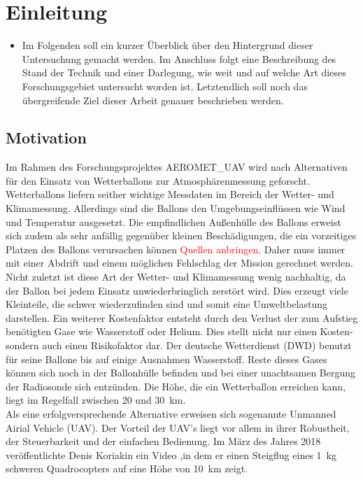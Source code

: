 \chapter{Einleitung}
\label{chap:Einleitung}
\begin{itemize}
	\item Im Folgenden soll ein kurzer Überblick über den Hintergrund dieser Untersuchung gemacht werden. Im Anschluss folgt eine Beschreibung des Stand der Technik und einer Darlegung, wie weit und auf welche Art dieses Forschungsgebiet untersucht worden ist. Letztendlich soll noch das übergreifende Ziel dieser Arbeit genauer beschrieben werden.
\end{itemize}

\section{Motivation}
\label{sec:motivation}
Im Rahmen des Forschungsprojektes AEROMET\_UAV wird nach Alternativen für den Einsatz von Wetterballons zur Atmosphärenmessung geforscht. Wetterballons liefern seither wichtige Messdaten im Bereich der Wetter- und Klimamessung. Allerdings sind die Ballons den Umgebungseinflüssen wie Wind und Temperatur ausgesetzt. Die empfindlichen Außenhülle des Ballons erweist sich zudem als sehr anfällig gegenüber kleinen Beschädigungen, die ein vorzeitiges Platzen des Ballons verursachen können \textcolor{red}{Quellen anbringen}. Daher muss immer mit einer Abdrift und einem möglichen Fehlschlag der Mission gerechnet werden. Nicht zuletzt ist diese Art der Wetter- und Klimamessung wenig nachhaltig, da der Ballon bei jedem Einsatz unwiederbringlich zerstört wird. Dies erzeugt viele Kleinteile, die schwer wiederzufinden sind und somit eine Umweltbelastung darstellen. Ein weiterer Kostenfaktor entsteht durch den Verlust der zum Aufstieg benötigten Gase wie Wasserstoff oder Helium. Dies stellt nicht nur einen Kosten- sondern auch einen Risikofaktor dar. Der deutsche Wetterdienst (DWD) benutzt für seine Ballone bis auf einige Ausnahmen Wasserstoff. Reste dieses Gases können sich noch in der Ballonhülle befinden und bei einer unachtsamen Bergung der Radiosonde sich entzünden.
Die Höhe, die ein Wetterballon erreichen kann, liegt im Regelfall zwischen \SI{20}{} und \SI{30}{km}. 
\\ 
Als eine erfolgversprechende Alternative erweisen sich sogenannte Unmanned Airial Vehicle (UAV). Der Vorteil der UAV's liegt vor allem in ihrer Robustheit, der Steuerbarkeit und der einfachen Bedienung. Im März des Jahres 2018 veröffentlichte Denis Koriakin ein Video \cite{Anderson.2018},in dem er einen Steigflug eines \SI{1}{kg} schweren Quadrocopters auf eine Höhe von \SI{10}{km} zeigt. 



